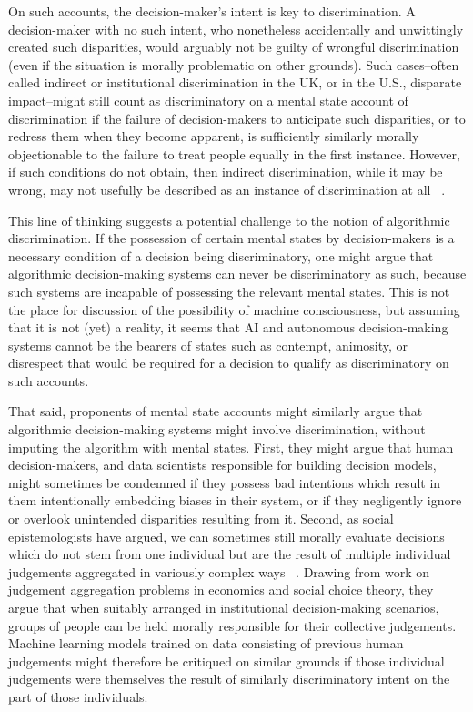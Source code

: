 \documentclass[pmlr,twocolumn,10pt]{jmlr}%
\begin{document}
On such accounts, the decision-maker's intent is key to discrimination. A decision-maker with no such intent, who nonetheless accidentally and unwittingly created such disparities, would arguably not be guilty of wrongful discrimination (even if the situation is morally problematic on other grounds). Such cases--often called indirect or institutional discrimination in the UK, or in the U.S., disparate impact--might still count as discriminatory on a mental state account of discrimination if the failure of decision-makers to anticipate such disparities, or to redress them when they become apparent, is sufficiently similarly morally objectionable to the failure to treat people equally in the first instance. However, if such conditions do not obtain, then indirect discrimination, while it may be wrong, may not usefully be described as an instance of discrimination at all ~\cite{eidelson2015discrimination}.

This line of thinking suggests a potential challenge to the notion of algorithmic discrimination. If the possession of certain mental states by decision-makers is a necessary condition of a decision being discriminatory, one might argue that algorithmic decision-making systems can never be discriminatory as such, because such systems are incapable of possessing the relevant mental states. This is not the place for discussion of the possibility of machine consciousness, but assuming that it is not (yet) a reality, it seems that AI and autonomous decision-making systems cannot be the bearers of states such as contempt, animosity, or disrespect that would be required for a decision to qualify as discriminatory on such accounts.

That said, proponents of mental state accounts might similarly argue that algorithmic decision-making systems might involve discrimination, without imputing the algorithm with mental states. First, they might argue that human decision-makers, and data scientists responsible for building decision models, might sometimes be condemned if they possess bad intentions which result in them intentionally embedding biases in their system, or if they negligently ignore or overlook unintended disparities resulting from it. Second, as social epistemologists have argued, we can sometimes still morally evaluate decisions which do not stem from one individual but are the result of multiple individual judgements aggregated in variously complex ways ~\cite{gilbert2004collective,pettit2007responsibility}. Drawing from work on judgement aggregation problems in economics and social choice theory, they argue that when suitably arranged in institutional decision-making scenarios, groups of people can be held morally responsible for their collective judgements. Machine learning models trained on data consisting of previous human judgements might therefore be critiqued on similar grounds if those individual judgements were themselves the result of similarly discriminatory intent on the part of those individuals.
\end{document}
